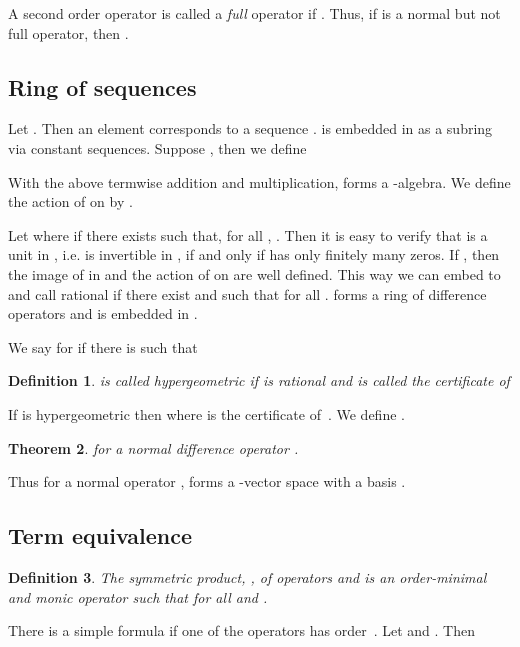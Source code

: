 \documentclass{article}
\newtheorem{theorem}{Theorem}[section]
\newtheorem{definition}[theorem]{Definition}
\begin{document}
A second order operator  is called a {\em
    full} operator if .  Thus, if  is a normal but not full
  operator, then .  





\subsection{Ring of sequences}

Let . Then an element 
  corresponds to a sequence .  is embedded in 
  as a subring via constant sequences.  Suppose , then we define

With the above termwise addition and multiplication,  forms a -algebra.  We
define the action of  on  by .

Let  where  if there exists  such
that, for all , .  Then it is easy to verify that  is a unit in
, i.e.  is invertible in , if and only if  has only finitely
many zeros.  If , then the image of  in  and the action of  on
 are well defined. This way we can embed  to  and call 
rational if there exist  and  such that  for all .   forms a ring of difference operators and  is embedded in
.


We say  for  if there is  such that


\begin{definition}
 is called hypergeometric if  is rational and 
 is called the certificate of 
\end{definition}
If  is hypergeometric then  where  is the certificate of~.
We define .

\begin{theorem}\cite[Theorem 8.2.1]{AeqB}
 for a normal difference
operator . 
\end{theorem}

Thus for a normal operator ,  forms a -vector space 
with a basis .






\subsection{Term equivalence}\label{sec:sp}

\begin{definition}\label{def:sp}
  The symmetric product, , of operators  and  is an
  order-minimal and monic operator such that  for all  and . 
\end{definition}

There is a simple formula if one of the operators has order~.  Let  and . Then
\end{document}

